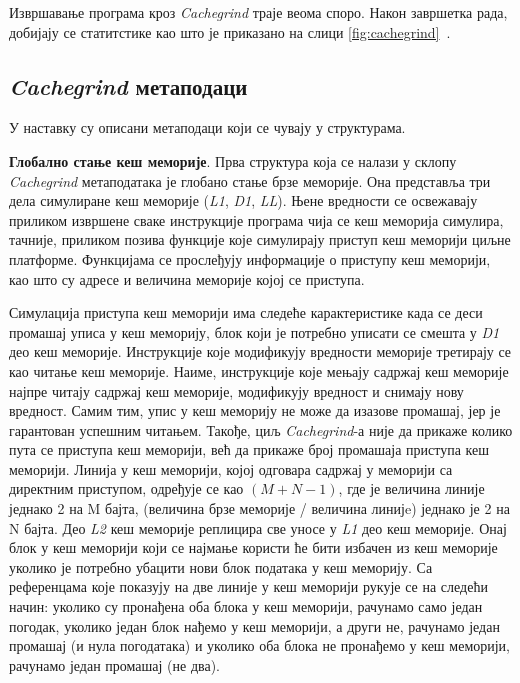 \documentclass[12pt,oneside]{memoir}
\begin{document}
\indent Извршавање програма кроз \textit{Cachegrind} траје веома споро. Након завршетка рада, добијају се статитстике као што је приказано на слици \ref{fig:cachegrind}~\cite{cachegrindRef}.

\subsection{\textit{Cachegrind} метаподаци}

\indent У наставку су описани метаподаци који се чувају у структурама.

\indent \textbf{Глобално стање кеш меморије}. Прва структура која се налази у склопу \textit{Cachegrind} метаподатака је глобано стање брзе меморије. Она представља три дела симулиране кеш меморије (\textit{L1}, \textit{D1},  \textit{LL}). Њене вредности се освежавају приликом извршене сваке инструкције програма чија се кеш меморија симулира, тачније, приликом позива функције које симулирају приступ кеш меморији циљне платформе. Функцијама се прослеђују информације о приступу кеш меморији, као што су адресе и величина меморије којој се приступа.

\indent Симулација приступа кеш меморији има следеће карактеристике када се деси промашај уписа у кеш меморију, блок који је потребно уписати се смешта у \textit{D1} део кеш меморије. Инструкције које модификују вредности меморије третирају се као читање кеш меморије. Наиме, инструкције које мењају садржај кеш меморије најпре читају садржај кеш меморије, модификују вредност и снимају нову вредност. Самим тим, упис у кеш меморију не може да изазове промашај, јер је гарантован успешним читањем. Такође, циљ \textit{Cachegrind}-а није да прикаже колико пута се приступа кеш меморији, већ да прикаже број промашаја приступа кеш меморији. Линија у кеш меморији, којој одговара садржај у меморији са директним приступом, одређује се као $(M + N - 1)$, где је величина линије једнако 2 на M бајта, (величина брзе меморије / величина линијe) једнако је 2 на N бајта. Део \textit{L2} кеш меморије реплицира све уносе у \textit{L1} део кеш меморије. Онај блок у кеш меморији који се најмање користи ће бити избачен из кеш меморије уколико је потребно убацити нови блок података у кеш меморију. Са референцама које показују на две линије у кеш меморији рукује се на следећи начин: уколико су пронађена оба блока у кеш меморији, рачунамо само један погодак, уколико један блок нађемо у кеш меморији, а други не, рачунамо један промашај (и нула погодатака) и уколико оба блока не пронађемо у кеш меморији, рачунамо један промашај (не два).
\end{document}
